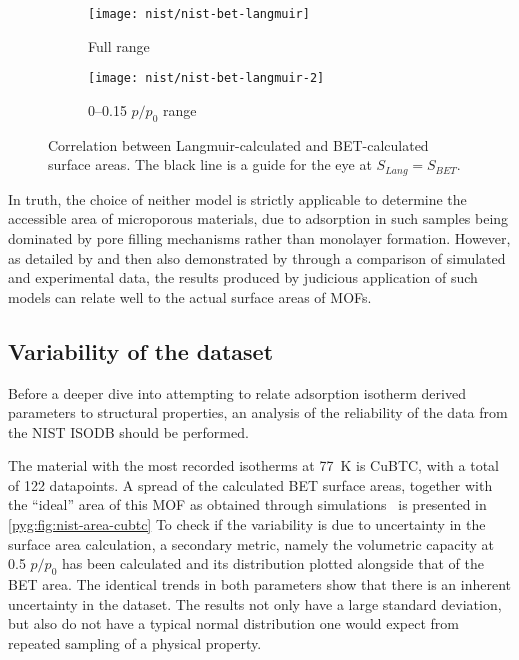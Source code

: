 \begin{figure}[htb]
	\centering

	\begin{subfigure}{0.42\linewidth}
		\texttt{[image: nist/nist-bet-langmuir]}
		\caption{Full range}%
		\label{pyg:fig:nist-bet-langmuir}
	\end{subfigure}%
	\begin{subfigure}{0.5\linewidth}
		\texttt{[image: nist/nist-bet-langmuir-2]}
		\caption{0--0.15 \(p/p_0\) range}%
		\label{pyg:fig:nist-bet-langmuir-adj}
	\end{subfigure}%

	\caption{Correlation between Langmuir-calculated and
	\gls{BET}-calculated surface areas. The black line is a guide
		for the eye at \(S_{Lang} = S_{BET}\).}%
	\label{pyg:fig:nist-area-cmp}
\end{figure}

In truth, the choice of neither model is strictly
applicable to determine the accessible area of microporous
materials, due to adsorption in such samples being dominated
by pore filling mechanisms rather than monolayer formation.
However, as detailed by
\citet{rouquerolBetEquationApplicable2007}
and then also demonstrated by
\citet{waltonApplicabilityBETMethod2007}
through a comparison of simulated and
experimental data, the results
produced by judicious application of such models can relate
well to the actual surface areas of \glspl{MOF}.

\subsection{Variability of the dataset}

Before a deeper dive into attempting to relate adsorption isotherm
derived parameters to structural properties, an analysis of the
reliability of the data from the \gls{NIST} ISODB should be performed.

The material with the most recorded  isotherms at \SI{77}{\kelvin}
is CuBTC, with a total of 122 datapoints. 
A spread of the calculated \gls{BET} surface areas,
together with the ``ideal'' area of this \gls{MOF} as obtained
through simulations~\cite{parkHowReproducibleAre2017} is
presented in \autoref{pyg:fig:nist-area-cubtc}
To check if the variability is due to uncertainty in the
surface area calculation, a secondary metric, namely the
volumetric capacity at 0.5 \(p/p_0\) has been calculated and its
distribution plotted alongside that of the \gls{BET} area. The
identical trends in both parameters show that there is an
inherent uncertainty in the dataset. The results not only
have a large standard deviation, but also do not have a
typical normal distribution one would expect from repeated
sampling of a physical property.

